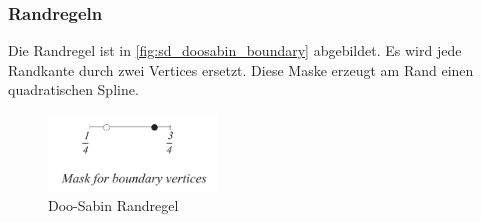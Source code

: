 \subsubsection*{Randregeln}

Die Randregel ist in \autoref{fig:sd_doosabin_boundary} abgebildet.
Es wird jede Randkante durch zwei Vertices ersetzt.
Diese Maske erzeugt am Rand einen quadratischen Spline.
\cite[S. 79f]{Zorin.subdivcourse}

\begin{figure}
\centering
\includegraphics[width=0.4\textwidth]{content/media/sd_doosabin_boundary.jpg}
\caption{Doo-Sabin Randregel \cite[S. 80]{Zorin.subdivcourse}}
\label{fig:sd_doosabin_boundary}
\end{figure}

